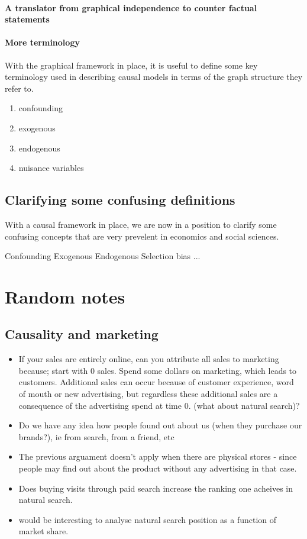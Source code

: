 \subsubsection{A translator from graphical independence to counter factual statements}

\subsubsection{More terminology}
With the graphical framework in place, it is useful to define some key terminology used in describing causal models in terms of the graph structure they refer to.

\begin{enumerate}
\item confounding
\item exogenous
\item endogenous
\item nuisance variables
\end{enumerate} 

\section{Clarifying some confusing definitions}

With a causal framework in place, we are now in a position to clarify some confusing concepts that are very prevelent in economics and social sciences.

Confounding
Exogenous
Endogenous
Selection bias
...

\chapter*{Random notes}

\section*{Causality and marketing}
\begin{itemize}
\item If your sales are entirely online, can you attribute all sales to marketing because; start with 0 sales. Spend some dollars on marketing, which leads to customers. Additional sales can occur because of customer experience, word of mouth or new advertising, but regardless these additional sales are a consequence of the advertising spend at time 0. (what about natural search)? 
\item Do we have any idea how people found out about us (when they purchase our brands?), ie from search, from a friend, etc
\item The previous arguament doesn't apply when there are physical stores - since people may find out about the product without any advertising in that case. 
\item Does buying visits through paid search increase the ranking one acheives in natural search. 
\item would be interesting to analyse natural search position as a function of market share. 
\end{itemize}


